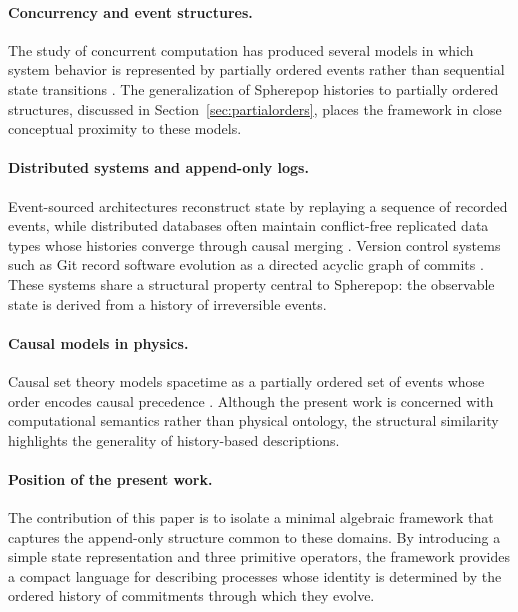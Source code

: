 \documentclass[12pt]{article}
\begin{document}
\paragraph{Concurrency and event structures.} The study of concurrent computation has produced several models in which system behavior is represented by partially ordered events rather than sequential state transitions \cite{winskel1995}. The generalization of Spherepop histories to partially ordered structures, discussed in Section~\ref{sec:partialorders}, places the framework in close conceptual proximity to these models.

\paragraph{Distributed systems and append-only logs.} Event-sourced architectures \cite{fowler2005} reconstruct state by replaying a sequence of recorded events, while distributed databases often maintain conflict-free replicated data types whose histories converge through causal merging \cite{shapiro2011}. Version control systems such as Git record software evolution as a directed acyclic graph of commits \cite{chacon2014}. These systems share a structural property central to Spherepop: the observable state is derived from a history of irreversible events.

\paragraph{Causal models in physics.} Causal set theory models spacetime as a partially ordered set of events whose order encodes causal precedence \cite{brightwell1991}. Although the present work is concerned with computational semantics rather than physical ontology, the structural similarity highlights the generality of history-based descriptions.

\paragraph{Position of the present work.} The contribution of this paper is to isolate a minimal algebraic framework that captures the append-only structure common to these domains. By introducing a simple state representation and three primitive operators, the framework provides a compact language for describing processes whose identity is determined by the ordered history of commitments through which they evolve.

\end{document}
